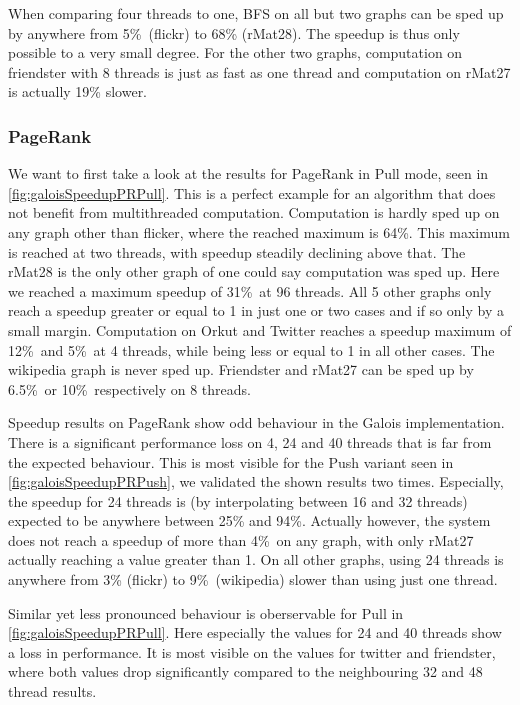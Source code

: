 When comparing four threads to one, BFS on all but two graphs can be sped up by anywhere from 5\%\ (flickr) to 68\% (rMat28). The speedup is thus only possible to a very small degree.
For the other two graphs, computation on friendster with 8 threads is just as fast as one thread and computation on rMat27 is actually 19\% slower.








\subsubsection{PageRank}
We want to first take a look at the results for PageRank in Pull mode, seen in \autoref{fig:galoisSpeedupPRPull}. This is a perfect example for an algorithm that does not benefit from multithreaded computation. 
Computation is hardly sped up on any graph other than flicker, where the reached maximum is 64\%. This maximum is reached at two threads, with speedup steadily declining above that.
The rMat28 is the only other graph of one could say computation was sped up. Here we reached a maximum speedup of 31\%\ at 96 threads.
All 5 other graphs only reach a speedup greater or equal to 1 in just one or two cases and if so only by a small margin.
Computation on Orkut and Twitter reaches a speedup maximum of 12\%\ and 5\%\ at 4 threads, while being less or equal to 1 in all other cases.
The wikipedia graph is never sped up.
Friendster and rMat27 can be sped up by 6.5\%\ or 10\%\ respectively on 8 threads.

Speedup results on PageRank show odd behaviour in the Galois implementation.
There is a significant performance loss on 4, 24 and 40 threads that is far from the expected behaviour. This is most visible for the Push variant seen in \autoref{fig:galoisSpeedupPRPush}, we validated the shown results two times.
Especially, the speedup for 24 threads is (by interpolating between 16 and 32 threads) expected to be anywhere between 25\% and 94\%.
Actually however, the system does not reach a speedup of more than 4\%\ on any graph, with only rMat27 actually reaching a value greater than 1. 
On all other graphs, using 24 threads is anywhere from 3\% (flickr) to 9\%\ (wikipedia) slower than using just one thread.

Similar yet less pronounced behaviour is oberservable for Pull in \autoref{fig:galoisSpeedupPRPull}. 
Here especially the values for 24 and 40 threads show a loss in performance.
It is most visible on the values for twitter and friendster, where both values drop significantly compared to the neighbouring 32 and 48 thread results.

